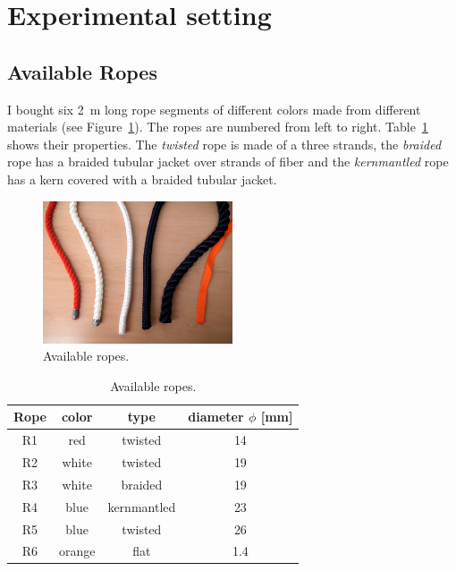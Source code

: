     \section{Experimental setting}

        \subsection{Available Ropes} \label{sec:AvailableRopes}
            I bought six \SI{2}{m} long rope segments of different colors made from different materials (see Figure~\ref{fig:AvailableRopes}). The ropes are numbered from left to right. Table~\ref{table:AvailableRopes} shows their properties. The \emph{twisted} rope is made of a three strands, the \emph{braided} rope has a braided tubular jacket over strands of fiber and the \emph{kernmantled} rope has a kern covered with a braided tubular jacket.

            \begin{figure}
            \includegraphics[width=0.5\textwidth]{RopesAdj.png}
            \centering
            \caption{Available ropes.}
            \label{fig:AvailableRopes}
            \end{figure}

            \begin{table}\centering
            \begin{tabular}{@{}cccc@{}}\toprule
            Rope & color & type & diameter $\phi$ [mm]\\ \midrule
            R1 & red & twisted & 14\\
            R2 & white & twisted & 19\\
            R3 & white & braided & 19\\
            R4 & blue & kernmantled & 23\\
            R5 & blue & twisted & 26\\
            R6 & orange & flat & 1.4\\
            \end{tabular}
            \caption{Available ropes.}
            \label{table:AvailableRopes}
            \end{table}


